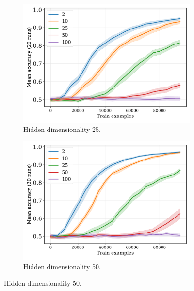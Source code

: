 \begin{figure}[H]
  \begin{subfigure}{0.45\linewidth}
    \includegraphics[width=1\textwidth]{../fig/flatpremack-h1-train_size-embed_dim-hidden_dim=25.pdf}
    \caption{Hidden dimensionality 25.}
  \end{subfigure}
  \hfill
  \begin{subfigure}{0.45\linewidth}
    \includegraphics[width=1\textwidth]{../fig/flatpremack-h1-train_size-embed_dim-hidden_dim=50.pdf}
    \caption{Hidden dimensionality 50.}
  \end{subfigure}

  \vspace{24pt}


\end{figure}
